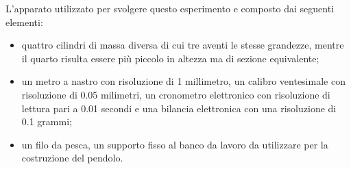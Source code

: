 L'apparato utilizzato per svolgere questo esperimento e composto dai seguenti elementi:
\begin{itemize}
	\item{quattro cilindri di massa diversa di cui tre aventi le stesse grandezze, mentre il quarto risulta essere più piccolo in altezza ma di sezione equivalente;}
	\item{un metro a nastro con risoluzione di 1 millimetro, un calibro ventesimale con risoluzione di 0.05 milimetri, un cronometro elettronico con risoluzione di lettura pari a 0.01 secondi e una bilancia elettronica con una risoluzione di 0.1 grammi;}
	\item{un filo da pesca, un supporto fisso al banco da lavoro da utilizzare per la costruzione del pendolo.}
\end{itemize}
